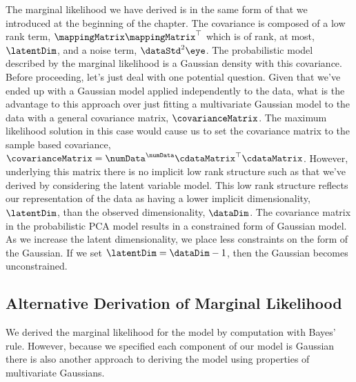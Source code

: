 The marginal likelihood we have derived is in the same form of that we
introduced at the beginning of the chapter. The covariance is composed
of a low rank term, $\mappingMatrix\mappingMatrix^\top$ which is of
rank, at most, $\latentDim$, and a noise term, $\dataStd^2\eye$. The
probabilistic model described by the marginal likelihood is a Gaussian
density with this covariance. Before proceeding, let's just deal with
one potential question. Given that we've ended up with a Gaussian
model applied independently to the data, what is the advantage to this
approach over just fitting a multivariate Gaussian model to the data
with a general covariance matrix, $\covarianceMatrix$. The maximum
likelihood solution in this case would cause us to set the covariance
matrix to the sample based covariance,
$\covarianceMatrix=\numData^\numData\cdataMatrix^\top\cdataMatrix$. However,
underlying this matrix there is no implicit low rank structure such as
that we've derived by considering the latent variable model. This low
rank structure reflects our representation of the data as having a
lower implicit dimensionality, $\latentDim$, than the observed
dimensionality, $\dataDim$. The covariance matrix in the probabilistic
PCA model results in a constrained form of Gaussian model. As we increase the latent dimensionality, we place less constraints on the form of the Gaussian. If we set
$\latentDim=\dataDim-1$, then the Gaussian becomes unconstrained. 

\subsection{Alternative Derivation of Marginal Likelihood}

We derived the marginal likelihood for the model by computation with
Bayes' rule. However, because we specified each component of our model
is Gaussian there is also another approach to deriving the model using
properties of multivariate Gaussians.

